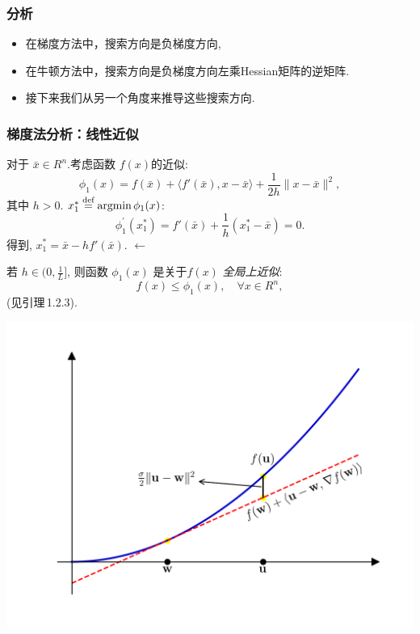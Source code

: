 \documentclass[handout,10pt]{beamer} %
\begin{document}
\begin{frame}[fragile]
\frametitle{分析}


\begin{itemize}
  \item
在梯度方法中，搜索方向是负梯度方向,

\item
在牛顿方法中，搜索方向是负梯度方向左乘Hessian矩阵的逆矩阵.
\item
接下来我们从另一个角度来推导这些搜索方向.

\end{itemize}

\end{frame}

\begin{frame}[fragile]
\frametitle{梯度法分析：线性近似}
对于 $\bar{x}\in R^n$.考虑函数 $f(x)$的近似:
$$
    \phi_1(x) = f(\bar{x}) + \langle f'(\bar{x}), x-\bar{x}\rangle +\frac{1}{2h}\|x-\bar{x}\|^2,
$$
其中 $h>0$.
  $x_1^* \stackrel{\textnormal{def}}{=} \textnormal{argmin}\, \phi_1(x)$:
$$
    \phi_1^{\prime}(x_1^*) = f'(\bar{x}) + \frac{1}{h}(x_1^* - \bar{x}) = 0.
$$
得到, $x_1^* = \bar{x}-hf'(\bar{x})$.
$\leftarrow$ 

\medskip

\begin{minipage}{0.5\textwidth}
若 $h\in(0,\frac{1}{L}]$, 则函数 $\phi_1(x)$ 是关于$f(x)$ \textit{全局上近似}:
$$
    f(x) \leq \phi_1(x), \quad \forall x\in R^n,
$$
(见引理\,1.2.3).
\end{minipage}
\qquad
\begin{minipage}{0.25\textwidth}
 \begin{center}
  \includegraphics[width=1.8\columnwidth]{figure/newton fig2.png}
 \end{center}
\end{minipage}



\end{frame}
\end{document}
